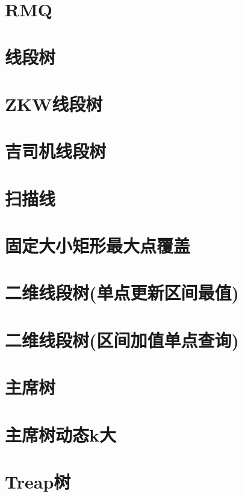 \section{RMQ}
\raggedbottom
\hrulefill
\section{线段树}
\raggedbottom
\hrulefill
\section{ZKW线段树}
\raggedbottom
\hrulefill
\section{吉司机线段树}
\raggedbottom
\hrulefill
\section{扫描线}
\raggedbottom
\hrulefill
\section{固定大小矩形最大点覆盖}
\raggedbottom
\hrulefill
\section{二维线段树(单点更新区间最值)}
\raggedbottom
\hrulefill
\section{二维线段树(区间加值单点查询)}
\raggedbottom
\hrulefill
\section{主席树}
\raggedbottom
\hrulefill
\section{主席树动态k大}
\raggedbottom
\hrulefill
\section{Treap树}
\raggedbottom
\hrulefill
